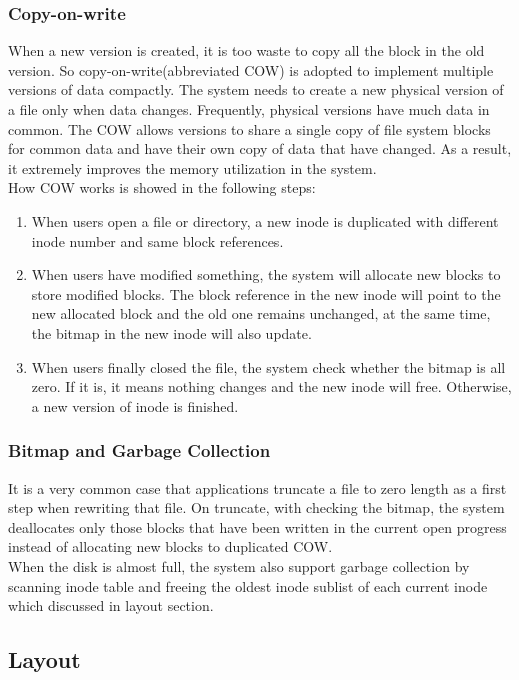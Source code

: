 \subsubsection{Copy-on-write}
When a new version is created, it is too waste to copy all the block in the old version. So copy-on-write(abbreviated COW) is adopted to implement multiple versions of data compactly. The system needs to create a new physical version of a file only when data changes. Frequently, physical versions have much data in common. The COW allows versions to share a single copy of file system blocks for common data and have their own copy of data that have changed. As a result, it extremely improves the memory utilization in the system.\\[1em]How COW works is showed in the following steps:
\begin{enumerate}
\item When users open a file or directory, a new inode is duplicated with different inode number and same block references.
\item When users have modified something, the system will allocate new blocks to store modified blocks. The block reference in the new inode will point to the new allocated block and the old one remains unchanged, at the same time, the bitmap in the new inode will also update. 
\item When users finally closed the file, the system check whether the bitmap is all zero. If it is, it means nothing changes and the new inode will free. Otherwise, a new version of inode is finished.
\end{enumerate}
\subsubsection{Bitmap and Garbage Collection} 
It is a very common case that applications truncate a file to zero length as a first step when rewriting that file. On truncate, with checking the bitmap, the system deallocates only those blocks that have been written in the current open progress instead of allocating new blocks to duplicated COW.\\[1em]
When the disk is almost full, the system also support garbage collection by scanning inode table and freeing the oldest inode sublist of each current inode which discussed in layout section.
\subsection{Layout}

